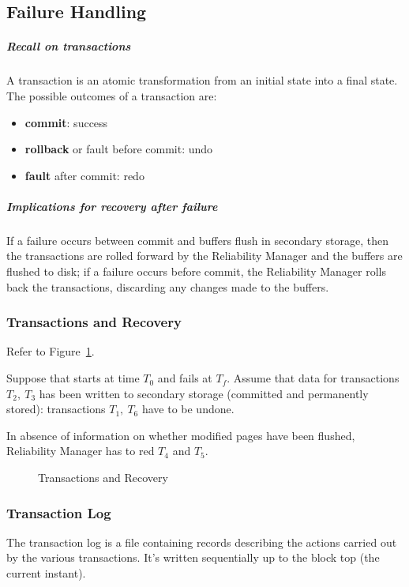 \documentclass[english]{article}
\begin{document}
\subsection{Failure Handling}

\subparagraph*{Recall on transactions}
A transaction is an atomic transformation from an initial state into a final state.
The possible outcomes of a transaction are:

\begin{itemize}
  \item \textbf{commit}: success
  \item \textbf{rollback} or fault before commit: undo
  \item \textbf{fault} after commit: redo
\end{itemize}

\subparagraph*{Implications for recovery after failure}
If a failure occurs between commit and buffers flush in secondary storage, then the transactions are rolled forward by the Reliability Manager and the buffers are flushed to disk;
if a failure occurs before commit, the Reliability Manager rolls back the transactions, discarding any changes made to the buffers.

\subsubsection{Transactions and Recovery}

Refer to Figure~\ref{fig:transaction-recovery}.

Suppose that \dbms starts at time \(T_0\) and fails at \(T_f\).
Assume that data for transactions \(T_2,\ T_3\) has been written to secondary storage (committed and permanently stored):
transactions \(T_1,\ T_6\) have to be undone.

In absence of information on whether modified pages have been flushed, Reliability Manager has to red \(T_4\) and \(T_5\).

\begin{figure}[htbp]
  \centering
  \bigskip
  \caption{Transactions and Recovery}
  \label{fig:transaction-recovery}
  \bigskip
\end{figure}

\subsubsection{Transaction Log}

The transaction log is a file containing records describing the actions carried out by the various transactions.
It's written sequentially up to the block top (the current instant).
\end{document}
